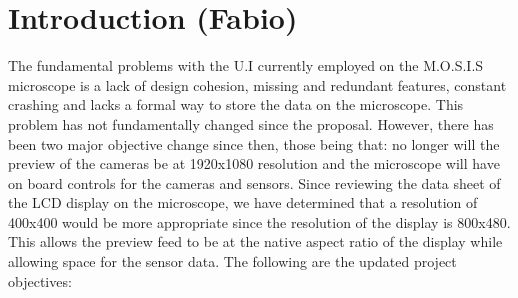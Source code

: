 \section{Introduction (Fabio)}
The fundamental problems with the U.I currently employed on the M.O.S.I.S microscope is a lack of design cohesion, missing and redundant features, constant crashing and lacks a formal way to store the data on the microscope. This problem has not fundamentally changed since the proposal. However, there has been two major objective change since then, those being that: no longer will the preview of the cameras be at 1920x1080 resolution and the microscope will have on board controls for the cameras and sensors. Since reviewing the data sheet of the LCD display on the microscope, we have determined that a resolution of 400x400 would be more appropriate since the resolution of the display is 800x480.\cite{5inchResistiveTouch} This allows the preview feed to be at the native aspect ratio of the display while allowing space for the sensor data. The following are the updated project objectives:
